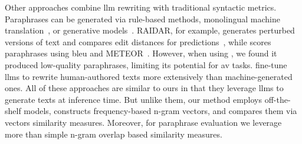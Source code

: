 Other approaches combine \ac{llm} rewriting with traditional syntactic metrics. 
Paraphrases can be generated via rule-based methods, monolingual machine translation~\citep{zhou_paraphrase_2021}, or generative models~\citep{kurt_pehlivanoglu_comparative_2024}. 
RAIDAR, for example, generates perturbed versions of text and compares edit distances for predictions~\citep{mao_raidar_2024}, while \mirrorMinds{} scores paraphrases using \acs{bleu} and METEOR~\citep{baradia_mirror_2025}. 
However, when using \mirrorMinds{}, we found it produced low-quality paraphrases, limiting its potential for \ac{av} tasks. %
\citet{li_learning_2025} fine-tune \acp{llm} to rewrite human-authored texts more extensively than machine-generated ones. 
All of these approaches are similar to ours in that they leverage \acp{llm} to generate texts at inference time. 
But unlike them, our method employs off-the-shelf models, constructs frequency-based n-gram vectors, and compares them via vectors similarity measures.
Moreover, for paraphrase evaluation we leverage more than simple n-gram overlap based similarity measures.
